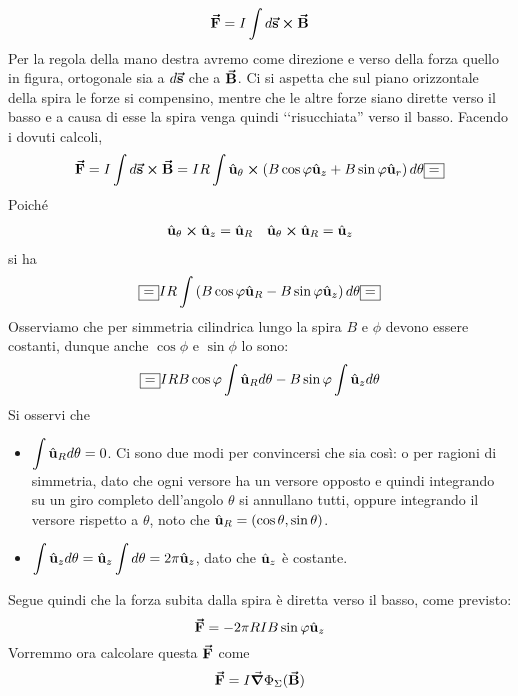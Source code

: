 \begin{equation*}
	\vb*{\va{F}}=I\int d\vb*{\va{s}}\cross\vb*{\va{B}}
\end{equation*}
Per la regola della mano destra avremo come direzione e verso della forza quello in figura, ortogonale sia a $d\vb*{\va{s}}$ che a $\vb*{\va{B}}$.
Ci si aspetta che sul piano orizzontale della spira le forze si compensino, mentre che le altre forze siano dirette verso il basso e a causa di esse la spira venga quindi ‘‘risucchiata'' verso il basso. Facendo i dovuti calcoli,
\begin{equation*}
	\vba{F}=I\int d\vba{s}\cross\vba{B}=IR\int\vbh{u}_{\theta}\cross\left(B\cos\phi\vbh{u}_z+B\sin\phi\vbh{u}_r\right)d\theta\squarequal
\end{equation*}
Poiché
\begin{align*}
	\hat{\mathbf{u}}_{\theta}\cross\hat{\mathbf{u}}_{z}=\hat{\mathbf{u}}_R&&
	\hat{\mathbf{u}}_{\theta}\cross\hat{\mathbf{u}}_{R}=\hat{\mathbf{u}}_z
\end{align*}
si ha
\begin{equation*}
	\squarequal IR\int \left(B\cos\phi\vbh{u}_R-B\sin\phi\vbh{u}_z\right)d\theta\squarequal
\end{equation*}
Osserviamo che per simmetria cilindrica lungo la spira $B$ e $\phi$ devono essere costanti, dunque anche $\cos\phi$ e $\sin\phi$ lo sono:
\begin{equation*}
	\squarequal IRB\cos\phi\int \vbh{u}_Rd\theta-B\sin\phi\int\vbh{u}_zd\theta
\end{equation*}
Si osservi che
\begin{itemize}
	\item $\displaystyle\int\hat{\mathbf{u}}_Rd\theta=0$. Ci sono due modi per convincersi che sia così: o per ragioni di simmetria, dato che ogni versore ha un versore opposto e quindi integrando su un giro completo dell'angolo $\theta$ si annullano tutti, oppure integrando il versore rispetto a $\theta$, noto che $\hat{\mathbf{u}}_R=\left(\cos\theta,\sin\theta\right)$. 
	\item $\displaystyle\int\hat{\mathbf{u}}_zd\theta=\hat{\mathbf{u}}_z\int d\theta=2\pi\hat{\mathbf{u}}_z$, dato che $\hat{\mathbf{u}}_z$ è costante.
\end{itemize}
Segue quindi che la forza subita dalla spira è diretta verso il basso, come previsto:
\begin{equation}
	\vb*{\va{F}}=-2\pi R I B\sin\varphi\hat{\mathbf{u}}_z
\end{equation}
Vorremmo ora calcolare questa $\vb*{\va{F}}$ come
\begin{equation*}
	\vb*{\va{F}}=I\grad{\Phi_{\Sigma}(\vb*{\va{B}})}
\end{equation*}
